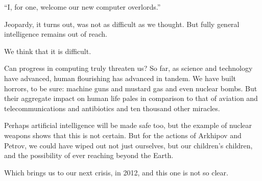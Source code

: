 \documentclass{article}
\begin{document}
	``I, for one, welcome our new computer overlords.''

Jeopardy, it turns out, was not as difficult as we thought. But fully general
intelligence remains out of reach.

We think that it is difficult.

\divider

Can progress in computing truly threaten us? So far, as science and technology
have advanced, human flourishing has advanced in tandem. We have built horrors,
to be sure: machine guns and mustard gas and even nuclear bombs. But their
aggregate impact on human life pales in comparison to that of aviation and
telecommunications and antibiotics and ten thousand other miracles.

Perhaps artificial intelligence will be made safe too, but the example of
nuclear weapons shows that this is not certain. But for the actions of Arkhipov
and Petrov, we could have wiped out not just ourselves, but our children's
children, and the possibility of ever reaching beyond the Earth. 

Which brings us to our next crisis, in 2012, and this one is not so clear.

\end{document}
